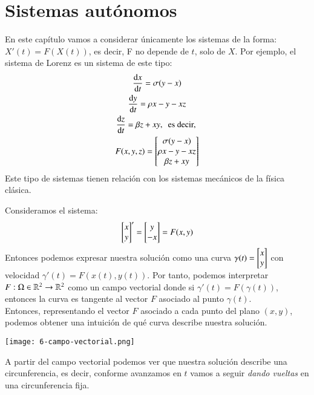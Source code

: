

\chapter{Sistemas aut\'onomos}

En este capítulo vamos a considerar únicamente los sistemas de la forma: $X'(t) = F(X(t))$, es decir, F no depende de $t$, solo de $X$.
Por ejemplo, el sistema de Lorenz es un sistema de este tipo:
\begin{gather*}
    \dd{x}{t} = \sigma(y-x)\\
    \dd{y}{t} = \rho x - y - xz\\
    \dd{z}{t} = \beta z + xy,\ \text{ es decir, }\\
    F(x, y, z) = \mx{\sigma(y-x)\\\rho x - y - xz\\ \beta z + xy}
\end{gather*}
Este tipo de sistemas tienen relación con los sistemas mecánicos de la física clásica.
\begin{eg}
    Consideramos el sistema:
    $$
        \mx{x\\y}' = \mx{y\\-x} = F(x, y)
    $$
    Entonces podemos expresar nuestra solución como una curva $\gamma(t) = \mx{x\\y}$ con velocidad $\gamma'(t) = F(x(t), y(t))$. Por tanto, podemos interpretar $F : \Omega \in \mathbb{R}^2 \to \mathbb{R}^2$ como un campo vectorial donde si $\gamma'(t) = F(\gamma(t))$, entonces la curva es tangente al vector $F$ asociado al punto $\gamma(t)$.\\
    Entonces, representando el vector $F$ asociado a cada punto del plano $(x, y)$, podemos obtener una intuición de qué curva describe nuestra solución.
    \begin{center}
        \texttt{[image: 6-campo-vectorial.png]}
    \end{center}
    A partir del campo vectorial podemos ver que nuestra solución describe una circunferencia, es decir, conforme avanzamos en $t$ vamos a seguir \textit{dando vueltas} en una circunferencia fija.\\
\end{eg}
